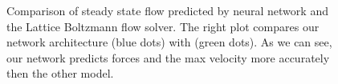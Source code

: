 \documentclass{article} %
\begin{document}
\begin{figure}[h]
\begin{center}
\end{center}
\caption{Comparison of steady state flow predicted by neural network and the Lattice Boltzmann flow solver. The right plot compares our network architecture (blue dots) with \citep{guo2016convolutional} (green dots). As we can see, our network predicts forces and the max velocity more accurately then the other model. }
\label{flow_accuracy}
\end{figure}
\end{document}
